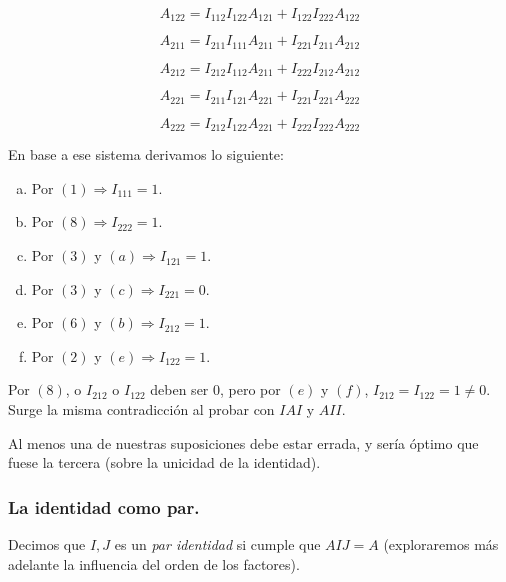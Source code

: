 \documentclass[a4paper, titlepage]{article}
\begin{document}
\begin{equation}
A_{122} = I_{112} I_{122} A_{121} + I_{122} I_{222} A_{122}
\end{equation}

\begin{equation}
A_{211} = I_{211} I_{111} A_{211} + I_{221} I_{211} A_{212}
\end{equation}

\begin{equation}
A_{212} = I_{212} I_{112} A_{211} + I_{222} I_{212} A_{212}
\end{equation}

\begin{equation}
A_{221} = I_{211} I_{121} A_{221} + I_{221} I_{221} A_{222}
\end{equation}

\begin{equation}
A_{222} = I_{212} I_{122} A_{221} + I_{222} I_{222} A_{222}
\end{equation}

En base a ese sistema derivamos lo siguiente:

\begin{enumerate}[(a)]
	\item Por $(1) \Rightarrow I_{111} = 1$.
	\item Por $(8) \Rightarrow I_{222} = 1$.
	\item Por $(3)$ y $(a) \Rightarrow I_{121} = 1$.
	\item Por $(3)$ y $(c) \Rightarrow I_{221} = 0$.
	\item Por $(6)$ y $(b) \Rightarrow I_{212} = 1$.
	\item Por $(2)$ y $(e) \Rightarrow I_{122} = 1$.
\end{enumerate}

Por $(8)$, o $I_{212}$ o $I_{122}$ deben ser $0$, pero por $(e)$ y $(f)$, $I_{212} = I_{122} = 1 \neq 0$. Surge la misma contradicción al probar con $IAI$ y $AII$.

Al menos una de nuestras suposiciones debe estar errada, y sería óptimo que fuese la tercera (sobre la unicidad de la identidad).

\subsubsection{La identidad como par.}

Decimos que $I, J$ es un \textit{par identidad} si cumple que $AIJ = A$ (exploraremos más adelante la influencia del orden de los factores).
\end{document}
